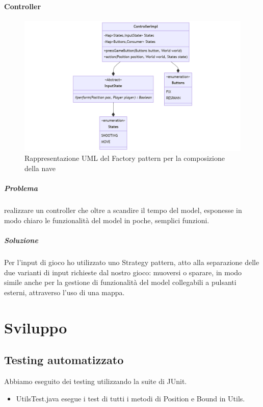 \documentclass[a4paper,12pt]{report}
\begin{document}
\subsubsection*{Controller}
\begin{figure}[H]
	\centering{}
	\includegraphics[width=\textwidth]{img/Controller.png}
	\caption{Rappresentazione UML del Factory pattern per la composizione della nave}
	\label{img:Controller}
\end{figure}
\paragraph{Problema} realizzare un controller che oltre a scandire il tempo del model, esponesse in modo chiaro le funzionalità del model in poche, semplici funzioni.
\paragraph{Soluzione} Per l'input di gioco ho utilizzato uno Strategy pattern, atto alla separazione delle due varianti di input richieste dal nostro gioco: muoversi o sparare, in modo simile anche per la gestione di funzionalità del model collegabili a pulsanti esterni, attraverso l'uso di una mappa.

\chapter{Sviluppo}
\section{Testing automatizzato}

Abbiamo eseguito dei testing utilizzando la suite di JUnit.
%
\begin{itemize}
	\item UtilsTest.java esegue i test di tutti i metodi di Position e Bound in Utils.
\end{itemize}
\end{document}
